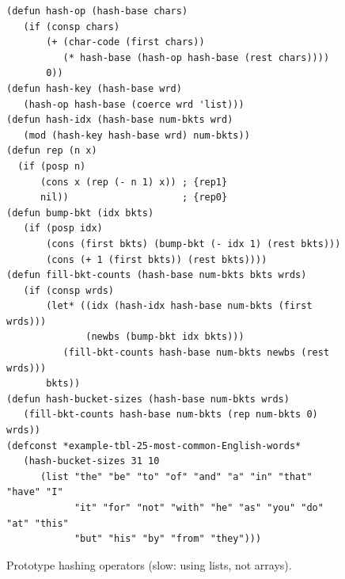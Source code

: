 \begin{figure}
\begin{center}
\begin{code}
\begin{verbatim}
(defun hash-op (hash-base chars)
   (if (consp chars)
       (+ (char-code (first chars))
          (* hash-base (hash-op hash-base (rest chars))))
       0))
(defun hash-key (hash-base wrd)
   (hash-op hash-base (coerce wrd 'list)))
(defun hash-idx (hash-base num-bkts wrd)
   (mod (hash-key hash-base wrd) num-bkts))
(defun rep (n x)
  (if (posp n)
      (cons x (rep (- n 1) x)) ; {rep1}
      nil))                    ; {rep0}
(defun bump-bkt (idx bkts)
   (if (posp idx)
       (cons (first bkts) (bump-bkt (- idx 1) (rest bkts)))
       (cons (+ 1 (first bkts)) (rest bkts))))
(defun fill-bkt-counts (hash-base num-bkts bkts wrds)
   (if (consp wrds)
       (let* ((idx (hash-idx hash-base num-bkts (first wrds)))
              (newbs (bump-bkt idx bkts)))
          (fill-bkt-counts hash-base num-bkts newbs (rest wrds)))
       bkts))
(defun hash-bucket-sizes (hash-base num-bkts wrds)
   (fill-bkt-counts hash-base num-bkts (rep num-bkts 0) wrds))
(defconst *example-tbl-25-most-common-English-words*
   (hash-bucket-sizes 31 10
      (list "the" "be" "to" "of" "and" "a" "in" "that" "have" "I"
            "it" "for" "not" "with" "he" "as" "you" "do" "at" "this"
            "but" "his" "by" "from" "they")))
\end{verbatim}
\end{code}
\caption{Prototype hashing operators (slow: using lists, not arrays).}
\label{fig:hash-defuns}
\end{center}
\end{figure}

